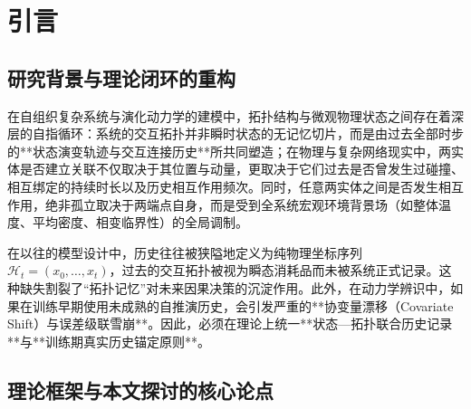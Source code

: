 \documentclass[11pt,a4paper]{article}
\numberwithin{equation}{section}
\theoremstyle{definition}
\theoremstyle{remark}
\begin{document}
	\tableofcontents
	\vspace{1em}
	
	\section{引言}\label{sec:intro}
	
	\subsection{研究背景与理论闭环的重构}
	
	在自组织复杂系统与演化动力学的建模中，拓扑结构与微观物理状态之间存在着深层的自指循环：系统的交互拓扑并非瞬时状态的无记忆切片，而是由过去全部时步的**状态演变轨迹与交互连接历史**所共同塑造；在物理与复杂网络现实中，两实体是否建立关联不仅取决于其位置与动量，更取决于它们过去是否曾发生过碰撞、相互绑定的持续时长以及历史相互作用频次。同时，任意两实体之间是否发生相互作用，绝非孤立取决于两端点自身，而是受到全系统宏观环境背景场（如整体温度、平均密度、相变临界性）的全局调制。
	
	在以往的模型设计中，历史往往被狭隘地定义为纯物理坐标序列 $\mathcal{H}_t = (x_0, \dots, x_t)$，过去的交互拓扑被视为瞬态消耗品而未被系统正式记录。这种缺失割裂了“拓扑记忆”对未来因果决策的沉淀作用。此外，在动力学辨识中，如果在训练早期使用未成熟的自推演历史，会引发严重的**协变量漂移（Covariate Shift）与误差级联雪崩**。因此，必须在理论上统一**状态—拓扑联合历史记录**与**训练期真实历史锚定原则**。
	
	\subsection{理论框架与本文探讨的核心论点}
	
\end{document}
